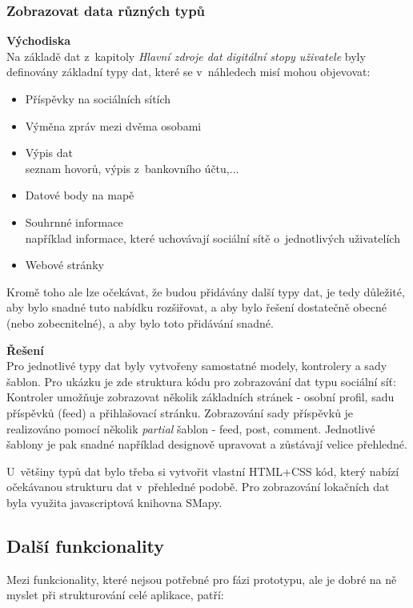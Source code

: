 \subsubsection*{Zobrazovat data různých typů}
	\textbf{Východiska}\\
	Na základě dat z~kapitoly \textit{Hlavní zdroje dat digitální stopy uživatele} byly definovány základní typy dat, které se v~náhledech misí mohou objevovat:

	\begin{itemize}
		\item Příspěvky na sociálních sítích
		\item Výměna zpráv mezi dvěma osobami
		\item Výpis dat\\
			seznam hovorů, výpis z~bankovního účtu,...
		\item Datové body na mapě
		\item Souhrnné informace\\
			například informace, které uchovávají sociální sítě o~jednotlivých uživatelích
		\item Webové stránky
	\end{itemize}

	Kromě toho ale lze očekávat, že budou přidávány další typy dat, je tedy důležité, aby bylo snadné tuto nabídku rozšiřovat, a aby bylo řešení dostatečně obecné (nebo zobecnitelné), a aby bylo toto přidávání snadné. 

	\textbf{Řešení}\\
	Pro jednotlivé typy dat byly vytvořeny samostatné modely, kontrolery a sady šablon. Pro ukázku je zde struktura kódu pro zobrazování dat typu sociální síť:\\
	Kontroler umožňuje zobrazovat několik základních stránek - osobní profil, sadu příspěvků (feed) a přihlašovací stránku.
	Zobrazování sady příspěvků je realizováno pomocí několik \textit{partial} šablon - feed, post, comment. Jednotlivé šablony je pak snadné například designově upravovat a zůstávají velice přehledné.

	U~většiny typů dat bylo třeba si vytvořit vlastní HTML+CSS kód, který nabízí očekávanou strukturu dat v~přehledné podobě.
	Pro zobrazování lokačních dat byla využita javascriptová knihovna SMapy.   


\subsection{Další funkcionality}
Mezi funkcionality, které nejsou potřebné pro fázi prototypu, ale je dobré na ně myslet při strukturování celé aplikace, patří:

